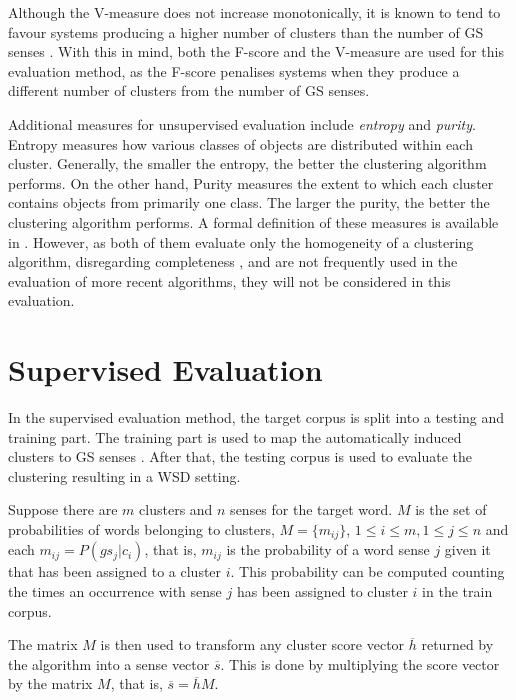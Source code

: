 Although the V-measure does not increase monotonically, it is known to tend to
favour systems producing a higher number of clusters than the number of \ac{GS}
senses \citep{manandhar2010semeval}. With this in mind, both the F-score and the
V-measure are used for this evaluation method, as the F-score penalises systems
when they produce a different number of clusters from the number of \ac{GS}
senses.

Additional measures for unsupervised evaluation include \textit{entropy} and
\textit{purity}. Entropy measures how various classes of objects are
distributed within each cluster. Generally, the smaller the entropy, the better
the clustering algorithm performs. On the other hand, Purity measures the extent
to which each cluster contains objects from primarily one class. The larger the
purity, the better the clustering algorithm performs. A formal definition of
these measures is available in \citep{zhao2005hierarchical}. However, as both of
them evaluate only the homogeneity of a clustering algorithm, disregarding
completeness \citep{manandhar2009semeval}, and are not frequently used in the
evaluation of more recent algorithms, they will not be considered in this
evaluation.

\section{Supervised Evaluation}
\label{sec:supeval}

In the supervised evaluation method, the target corpus is split into a testing
and training part. The training part is used to map the automatically induced
clusters to \ac{GS} senses \citep{agirre2006evaluating}. After that, the testing
corpus is used to evaluate the clustering resulting in a \ac{WSD} setting.

Suppose there are $m$ clusters and $n$ senses for the target word. $M$ is the
set of probabilities of words belonging to clusters, $M = \{m_{ij}\}$, $1 \leq i
\leq m, 1 \leq j \leq n$ and each $m_{ij} = P(gs_j|c_i)$, that is, $m_{ij}$ is
the probability of a word sense $j$ given it that has been assigned to a cluster
$i$. This probability can be computed counting the times an occurrence with
sense $j$ has been assigned to cluster $i$ in the train corpus.

The matrix $M$ is then used to transform any cluster score vector $\overline{h}$
returned by the algorithm into a sense vector $\overline{s}$. This is done by
multiplying the score vector by the matrix $M$, that is, $\overline{s} =
\overline{h}M$.

